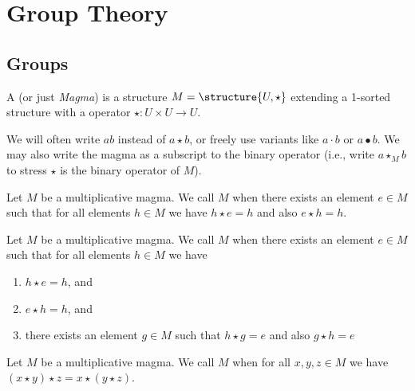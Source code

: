 
\chapter{Group Theory}

\section{Groups}

\begin{definition}
A  (or just \emph{Magma}) is a structure
$M=\structure{U,\star}$ extending a 1-sorted structure with a
 operator $\star\colon U\times U\to U$.

We will often write $ab$ instead of $a\star b$, or freely use variants
like $a\cdot b$ or $a\bullet b$. We may also write the magma as a
subscript to the binary operator (i.e., write $a\star_{M}b$ to stress
$\star$ is the binary operator of $M$).
\end{definition}

\begin{definition}
Let $M$ be a multiplicative magma. We call $M$ 
when there exists an element $e\in M$ such that for all elements $h\in M$
we have $h\star e=h$ and also $e\star h=h$.
\end{definition}

\begin{definition}
Let $M$ be a multiplicative magma. We call $M$ 
when there exists an element $e\in M$ such that for all elements $h\in M$
we have
\begin{enumerate}
\item $h\star e=h$, and
\item $e\star h=h$, and
\item there exists an element $g\in M$ such that $h\star g=e$ and also
  $g\star h=e$
\end{enumerate}
\end{definition}

\begin{definition}
Let $M$ be a multiplicative magma. We call $M$ 
when for all $x,y,z\in M$ we have $(x\star y)\star z=x\star(y\star z)$.
\end{definition}

